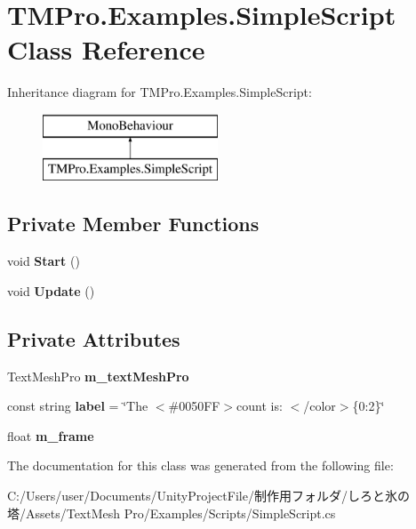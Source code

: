 \hypertarget{class_t_m_pro_1_1_examples_1_1_simple_script}{}\section{T\+M\+Pro.\+Examples.\+Simple\+Script Class Reference}
\label{class_t_m_pro_1_1_examples_1_1_simple_script}
Inheritance diagram for T\+M\+Pro.\+Examples.\+Simple\+Script\+:\begin{figure}[H]
\begin{center}
\leavevmode
\includegraphics[height=2.000000cm]{class_t_m_pro_1_1_examples_1_1_simple_script}
\end{center}
\end{figure}
\subsection*{Private Member Functions}
\begin{DoxyCompactItemize}
\item 
\mbox{\label{class_t_m_pro_1_1_examples_1_1_simple_script_afee2cd5e0dbf2244d09333d31ac27040}} 
void {\bfseries Start} ()
\item 
\mbox{\label{class_t_m_pro_1_1_examples_1_1_simple_script_a261280a451af9aef31d4520561416599}} 
void {\bfseries Update} ()
\end{DoxyCompactItemize}
\subsection*{Private Attributes}
\begin{DoxyCompactItemize}
\item 
\mbox{\label{class_t_m_pro_1_1_examples_1_1_simple_script_abe951526ba52e3418fd1d8faf157a35e}} 
Text\+Mesh\+Pro {\bfseries m\+\_\+text\+Mesh\+Pro}
\item 
\mbox{\label{class_t_m_pro_1_1_examples_1_1_simple_script_ae9e2786f4ae458c9eef5a57e5f09b533}} 
const string {\bfseries label} = \char`\"{}The $<$\#0050\+F\+F$>$count is\+: $<$/color$>$\{0\+:2\}\char`\"{}
\item 
\mbox{\label{class_t_m_pro_1_1_examples_1_1_simple_script_a32751c30269823988301892a247d825e}} 
float {\bfseries m\+\_\+frame}
\end{DoxyCompactItemize}


The documentation for this class was generated from the following file\+:\begin{DoxyCompactItemize}
\item 
C\+:/\+Users/user/\+Documents/\+Unity\+Project\+File/制作用フォルダ/しろと氷の塔/\+Assets/\+Text\+Mesh Pro/\+Examples/\+Scripts/Simple\+Script.\+cs\end{DoxyCompactItemize}
